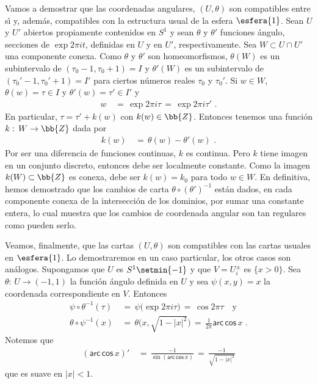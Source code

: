 \begin{ejemplo}
	Vamos a demostrar que las coordenadas angulares, $(U,\theta)$ son
	compatibles entre s\'{\i} y, adem\'{a}s, compatibles con la
	estructura usual de la esfera $\esfera{1}$. Sean $U$ y $U'$ abiertos
	propiamente contenidos en $S^{1}$ y sean $\theta$ y $\theta'$
	funciones \'{a}ngulo, secciones de $\exp{2\pi it}$, definidas en
	$U$ y en $U'$, respectivamente. Sea $W\subset U\cap U'$ una
	componente conexa. Como $\theta$ y $\theta'$ son homeomorfismos,
	$\theta(W)$ es un subintervalo de $(\tau_{0}-1,\tau_{0}+1)=I$ y
	$\theta'(W)$ es un subintervalo de $(\tau_{0}'-1,\tau_{0}'+1)=I'$ para
	ciertos n\'{u}meros reales $\tau_{0}$ y $\tau_{0}'$. Si $w\in W$,
	$\theta(w)=\tau\in I$ y $\theta'(w)=\tau'\in I'$ y
	\begin{align*}
		w & \,=\, \exp{2\pi i\tau} \,=\,\exp{2\pi i\tau'}
		\text{ .}
	\end{align*}
	En particular, $\tau=\tau'+ k(w)$ con $k(w)\in\bb{Z}$. Entonces
	tenemos una funci\'{o}n $k:\,W\rightarrow\bb{Z}$ dada por
	\begin{align*}
		k(w) & \,=\,\theta(w)-\theta'(w)
		\text{ .}
	\end{align*}
	Por ser una diferencia de funciones continuas, $k$ es continua.
	Pero $k$ tiene imagen en un conjunto discreto, entonces debe
	ser localmente constante. Como la imagen $k(W)\subset\bb{Z}$ es
	conexa, debe ser $k(w)=k_{0}$ para todo $w\in W$. En definitiva,
	hemos demostrado que los cambios de carta $\theta\circ(\theta')^{-1}$
	est\'{a}n dados, en cada componente conexa de la intersecci\'{o}n
	de los dominios, por sumar una constante entera, lo cual muestra
	que los cambios de coordenada angular son tan regulares como
	pueden serlo.

	Veamos, finalmente, que las cartas $(U,\theta)$ son compatibles
	con las cartas usuales en $\esfera{1}$. Lo demostraremos
	en un caso particular, los otros casos son an\'{a}logos.
	Supongamos que $U$ es $S^{1}\setmin\{-1\}$ y que $V=U_{i}^{\pm}$ es
	$\{x>0\}$. Sea $\theta:\,U\rightarrow (-1,1)$ la
	funci\'{o}n \'{a}ngulo definida en $U$ y sea $\psi(x,y)=x$
	la coordenada correspondiente en $V$. Entonces
	\begin{align*}
		\psi\circ\theta^{-1}(\tau) & \,=\,
			\psi\big(\exp{2\pi i\tau}\big)\,=\,
			\cos 2\pi\tau\quad\text{y} \\
		\theta\circ\psi^{-1}(x) & \,=\,
			\theta\big(x,\sqrt{1-|x|^{2}}\big)\,=\,
			\frac{1}{2\pi}\mathsf{arc\,cos}\, x
		\text{ .}
	\end{align*}
	Notemos que
	\begin{align*}
		(\mathsf{arc\,cos}\,x)' & \,=\,
			\frac{-1}{\sin(\mathsf{arc\,cos}\,x)} \,=\,
			\frac{-1}{\sqrt{1-|x|^{2}}}
	\end{align*}
	que es suave en $|x|<1$.
\end{ejemplo}

